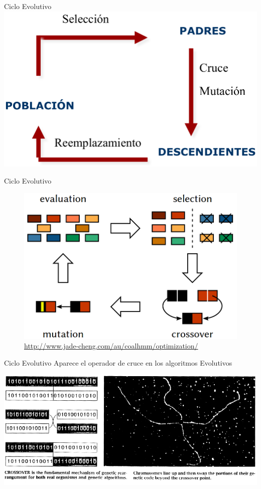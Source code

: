 \documentclass[10pt]{beamer}
\begin{document}
\begin{frame}[fragile]{Ciclo Evolutivo}
    \includegraphics[scale=.28]{imgs/ciclo_evolucion}
\end{frame}


\begin{frame}[fragile]{Ciclo Evolutivo}
    \begin{figure}
      \includegraphics[scale=.34]{imgs/ciclo_evolucion_3}
      \caption*{\url{http://www.jade-cheng.com/au/coalhmm/optimization/}}
    \end{figure}
\end{frame}


\begin{frame}[fragile]{Ciclo Evolutivo}
    Aparece el operador de cruce en los algoritmos Evolutivos

    \includegraphics[scale=.45]{imgs/chromosome_crossover}
\end{frame}
\end{document}
